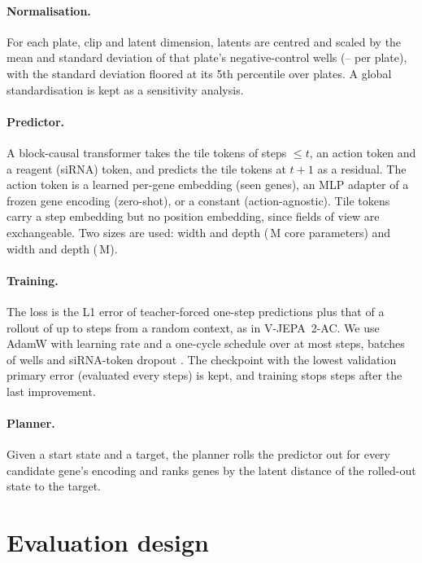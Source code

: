 \paragraph{Normalisation.} For each plate, clip and latent dimension, latents are centred and
scaled by the mean and standard deviation of that plate's negative-control wells
(\NNegPerPlateMin--\NNegPerPlateMax{} per plate), with the standard deviation floored at its 5th
percentile over plates. A global standardisation is kept as a sensitivity analysis.

\paragraph{Predictor.} A block-causal transformer takes the tile tokens of steps $\le t$, an
action token and a reagent (siRNA) token, and predicts the tile tokens at $t+1$ as a residual. The
action token is a learned per-gene embedding (seen genes), an MLP adapter of a frozen gene
encoding (zero-shot), or a constant (action-agnostic). Tile tokens carry a step embedding but no
position embedding, since fields of view are exchangeable. Two sizes are used: width
\WidthSmall{} and depth \DepthSmall{} (\ParamsSmall{}\,M core parameters) and width \WidthLarge{}
and depth \DepthLarge{} (\ParamsLarge{}\,M).

\paragraph{Training.} The loss is the L1 error of teacher-forced one-step predictions plus that
of a rollout of up to \RolloutSteps{} steps from a random context, as in V-JEPA~2-AC. We use
AdamW with learning rate \LearningRate{} and a one-cycle schedule over at most \MaxSteps{}
steps, batches of \BatchWells{} wells and siRNA-token dropout \SirnaDropout{}. The checkpoint with
the lowest validation primary error (evaluated every \EvalEvery{} steps) is kept, and training
stops \Patience{} steps after the last improvement.

\paragraph{Planner.} Given a start state and a target, the planner rolls the predictor out for
every candidate gene's encoding and ranks genes by the latent distance of the rolled-out state to
the target.

\section{Evaluation design}\label{sec:eval}

